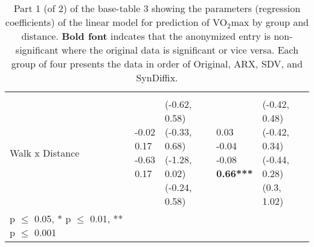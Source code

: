 \documentclass[10pt]{article}
\begin{document}
\begin{table}
\begin{center}
\begin{small}
\begin{tabular}{lllll}
& & & & \\ 
\quad Walk x Distance    &  \makecell[l]{\textnormal{-0.02\phantom{***}} \\\textnormal{0.17\phantom{***}} \\\textnormal{-0.63\phantom{***}} \\\textnormal{0.17\phantom{***}} \\}   &  \makecell[l]{\textnormal{(-0.62, 0.58)} \\\textnormal{(-0.33, 0.68)} \\\textnormal{(-1.28, 0.02)} \\\textnormal{(-0.24, 0.58)} \\}   &  \makecell[l]{\textnormal{0.03\phantom{***}} \\\textnormal{-0.04\phantom{***}} \\\textnormal{-0.08\phantom{***}} \\\textbf{0.66***} \\}   &  \makecell[l]{\textnormal{(-0.42, 0.48)} \\\textnormal{(-0.42, 0.34)} \\\textnormal{(-0.44, 0.28)} \\\textnormal{(0.3, 1.02)} \\} \\ 

      \bottomrule
      {\footnotesize * p $\leq$ 0.05, \quad** p $\leq$ 0.01, \quad*** p $\leq$ 0.001}
      \end{tabular}
      \end{small}
      \caption{Part 1 (of 2) of the base-table 3 showing the parameters (regression coefficients) of the linear model for prediction of VO$_2$max by group and distance. \textbf{Bold font} indcates that the anonymized entry is non-significant where the original data is significant or vice versa. Each group of four presents the data in order of Original, ARX, SDV, and SynDiffix. 
      }
      \label{tab:table3a}
      \end{center}
      \end{table}
      \setlength{\fboxsep}{3pt}
    
\end{document}
